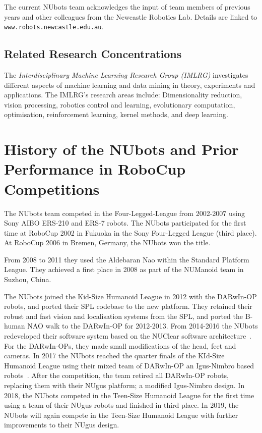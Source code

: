\documentclass{llncs}
\begin{document}
The current NUbots team acknowledges the input of team members of previous years and other colleagues from the Newcastle Robotics Lab. Details are linked to  \texttt{www.robots.newcastle.edu.au}.

\subsection{Related Research Concentrations}
The \emph{Interdisciplinary Machine Learning Research Group (IMLRG)} investigates different aspects of machine learning and data mining in theory, experiments and applications. The IMLRG's research areas include: Dimensionality reduction, vision processing, robotics control and learning,  evolutionary computation, optimisation, reinforcement learning, kernel methods, and deep learning.

\section{History of the NUbots and Prior Performance in RoboCup Competitions \cite{AmosEtAl2018}}
The NUbots team competed in the Four-Legged-League from 2002-2007 using Sony AIBO ERS-210 and ERS-7 robots. The NUbots participated for the first time at RoboCup 2002 in Fukuoka in the Sony Four-Legged League (third place). At RoboCup 2006 in Bremen, Germany, the NUbots won the title.

From 2008 to 2011 they used the Aldebaran Nao within the Standard Platform League. They achieved a first place in 2008 as part of the NUManoid team in Suzhou, China.

The NUbots joined the Kid-Size Humanoid League in 2012 with the DARwIn-OP robots, and ported their SPL codebase to the new platform. They retained their robust and fast vision and localisation systems from the SPL, and ported the B-human NAO walk to the DARwIn-OP for 2012-2013. From 2014-2016 the NUbots redeveloped their software system based on the NUClear software architecture~\cite{HoulistonEtAl2015}. For the DARwIn-OPs, they made small modifications of the head, feet and cameras. In 2017 the NUbots reached the quarter finals of the KId-Size Humanoid League using their mixed team of DARwIn-OP an Igus-Nimbro based robots~\cite{allgeuer2016igus}. After the competition, the team retired all DARwIn-OP robots, replacing them with their NUgus platform; a modified Igus-Nimbro design. In 2018, the NUbots competed in the Teen-Size Humanoid League for the first time using a team of their NUgus robots and finished in third place. In 2019, the NUbots will again compete in the Teen-Size Humanoid League with further improvements to their NUgus design.
\end{document}
